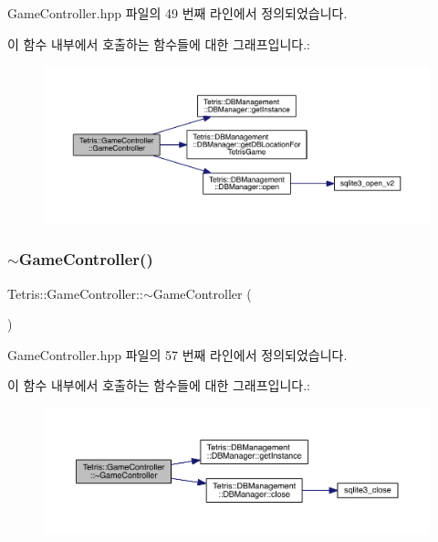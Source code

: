 Game\+Controller.\+hpp 파일의 49 번째 라인에서 정의되었습니다.

이 함수 내부에서 호출하는 함수들에 대한 그래프입니다.\+:
\nopagebreak
\begin{figure}[H]
\begin{center}
\leavevmode
\includegraphics[width=350pt]{class_tetris_1_1_game_controller_a968c9a79fca8a5a39e0c51edca0e5abb_cgraph}
\end{center}
\end{figure}
\mbox{\label{class_tetris_1_1_game_controller_a8c9011047ce96d89e4d913feb9a88eed}} 
\subsubsection{\texorpdfstring{$\sim$\+Game\+Controller()}{~GameController()}}
{\footnotesize\ttfamily Tetris\+::\+Game\+Controller\+::$\sim$\+Game\+Controller (\begin{DoxyParamCaption}{ }\end{DoxyParamCaption})\hspace{0.3cm}{\ttfamily [inline]}}



Game\+Controller.\+hpp 파일의 57 번째 라인에서 정의되었습니다.

이 함수 내부에서 호출하는 함수들에 대한 그래프입니다.\+:
\nopagebreak
\begin{figure}[H]
\begin{center}
\leavevmode
\includegraphics[width=350pt]{class_tetris_1_1_game_controller_a8c9011047ce96d89e4d913feb9a88eed_cgraph}
\end{center}
\end{figure}
\mbox{\label{class_tetris_1_1_game_controller_a5dd9a021a0a87bed079bc1ad309e4039}} 
